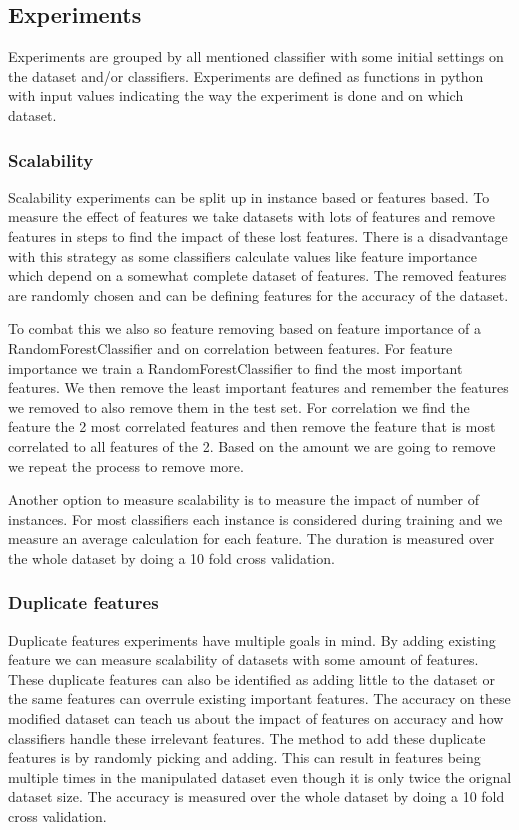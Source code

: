 \documentclass[a4paper,10pt]{article}
\begin{document}
\subsection{Experiments}
Experiments are grouped by all mentioned classifier with some initial settings on the dataset and/or classifiers. Experiments are defined as functions in python with input values indicating the way the experiment is done and on which dataset.
\subsubsection{Scalability}
Scalability experiments can be split up in instance based or features based. To measure the effect of features we take datasets with lots of features and remove features in steps to find the impact of these lost features. There is a disadvantage with this strategy as some classifiers calculate values like feature importance which depend on a somewhat complete dataset of features. The removed features are randomly chosen and can be defining features for the accuracy of the dataset. 

To combat this we also so feature removing based on feature importance of a RandomForestClassifier and on correlation between features. For feature importance we train a RandomForestClassifier to find the most important features. We then remove the least important features and remember the features we removed to also remove them in the test set. For correlation we find the feature the 2 most correlated features and then remove the feature that is most correlated to all features of the 2. Based on the amount we are going to remove we repeat the process to remove more.


Another option  to measure scalability is to measure the impact of number of instances. For most classifiers each instance is considered during training and we measure an average calculation for each feature. The duration is measured over the whole dataset by doing a 10 fold cross validation.

\subsubsection{Duplicate features}
Duplicate features experiments have multiple goals in mind. By adding existing feature we can measure scalability of datasets with some amount of features. These duplicate features can also be identified as adding little to the dataset or the same features can overrule existing important features. The accuracy on these modified dataset
can teach us about the impact of features on accuracy and how classifiers handle these irrelevant features. The method to add these duplicate features is by randomly picking and adding. This can result in features being multiple times in the manipulated  dataset even though it is only twice the orignal dataset size. The accuracy is measured over the whole dataset by doing a 10 fold cross validation.
\end{document}
